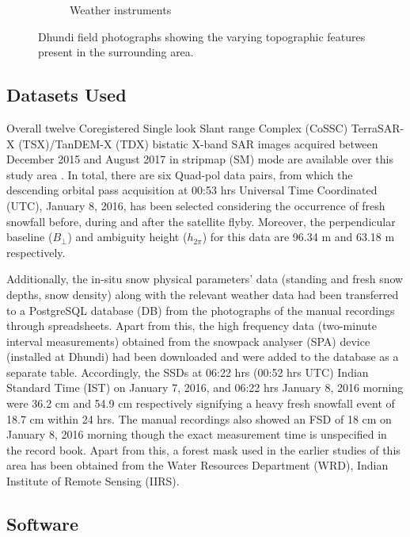 \documentclass[review]{elsarticle}
\numberwithin{equation}{section}
\numberwithin{figure}{section}
\numberwithin{table}{section}
\begin{document}
\begin{figure}[!t]
\begin{subfigure}[t]{0.49\textwidth}
        \caption{Weather instruments}
        \label{subfig:stations}
    \end{subfigure}
    \caption{Dhundi field photographs showing the varying topographic features present in the surrounding area.}
    \label{fig:field}
\end{figure}

\subsection{Datasets Used}
\label{ssec:data}
Overall twelve Coregistered Single look Slant range Complex (CoSSC) TerraSAR-X (TSX)/TanDEM-X (TDX) bistatic X-band SAR images acquired between December 2015 and August 2017 in stripmap (SM) mode are available over this study area \citep{Balss2012}. In total, there are six Quad-pol data pairs, from which the descending orbital pass acquisition at 00:53 hrs Universal Time Coordinated (UTC), January 8, 2016, has been selected considering the occurrence of fresh snowfall before, during and after the satellite flyby. Moreover, the perpendicular baseline ($B_\bot$) and ambiguity height ($h_{2\pi}$) for this data are 96.34 m and 63.18 m respectively. 

Additionally, the in-situ snow physical parameters’ data (standing and fresh snow depths, snow density) along with the relevant weather data had been transferred to a PostgreSQL database (DB) \citep{PostgreSQL2019} from the photographs of the manual recordings through spreadsheets. Apart from this, the high frequency data (two-minute interval measurements) obtained from the snowpack analyser (SPA) device (installed at Dhundi) had been downloaded and were added to the database as a separate table. Accordingly, the SSDs at 06:22 hrs (00:52 hrs UTC) Indian Standard Time (IST) on January 7, 2016, and 06:22 hrs January 8, 2016 morning were 36.2 cm and 54.9 cm respectively signifying a heavy fresh snowfall event of 18.7 cm within 24 hrs. The manual recordings also showed an FSD of 18 cm on January 8, 2016 morning though the exact measurement time is unspecified in the record book. Apart from this, a forest mask used in the earlier studies of this area \citep{Thakur2012, Thakur2017} has been obtained from the Water
Resources Department (WRD), Indian Institute of Remote Sensing (IIRS).

\subsection{Software}
\end{document}

